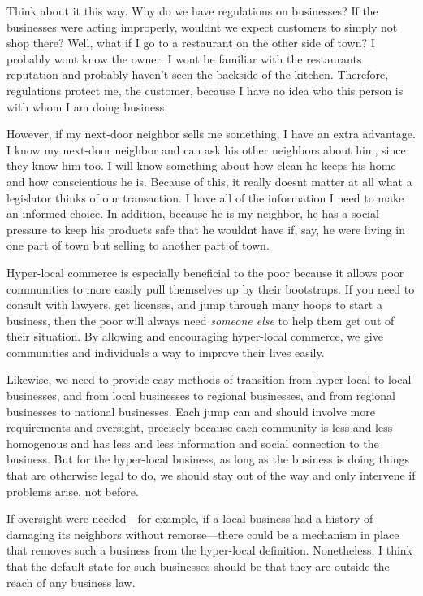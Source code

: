 Think about it this way. Why do we have regulations on businesses?  If
the businesses were acting improperly, wouldn{\textquotesingle}t we
expect customers to simply not shop there?  Well,
what if I go to a
restaurant on the other side of town? I probably won{\textquotesingle}t
know the owner. I won{\textquotesingle}t be familiar with the
restaurant{\textquotesingle}s reputation and probably haven’t seen the
backside of the kitchen. Therefore, regulations protect me, the
customer, because I have no idea who this person is with whom I am
doing business.


However, if my next-door neighbor sells me something, I have an extra
advantage. I know my next-door neighbor and can ask his other neighbors
about him, since they know him too. I will know something about how
clean he keeps his home and how conscientious he is. Because of this,
it really doesn{\textquotesingle}t matter at all what a legislator
thinks of our transaction. I have all of the information I need to make
an informed choice. In addition, because he is my neighbor, he has a
social pressure to keep his products safe that he
wouldn{\textquotesingle}t have if, say, he were living in one part of
town but selling to another part of town.


Hyper-local commerce
is especially beneficial to the poor because it allows poor communities
to more easily pull themselves up by their bootstraps. If you need to
consult with lawyers, get licenses, and jump through many hoops to
start a business, then the poor will always need \textit{someone else}
to help them get out of their situation. By allowing and encouraging
hyper-local commerce, we give communities and individuals a way to
improve their lives easily.


Likewise, we need to provide easy methods of transition from hyper-local
to local businesses, and from local businesses to regional businesses,
and from regional businesses to national businesses. Each jump can and
should involve more requirements and oversight, precisely because each
community is less and less homogenous and has less and less information
and social connection to the business. But for the hyper-local
business, as long as the business is doing things that are otherwise
legal to do, we should stay out of the way and only intervene if
problems arise, not before.


If oversight were
needed—for example, if a local business had a history of damaging its
neighbors without remorse—there could be a mechanism in place that
removes such a business from the hyper-local definition.  Nonetheless,
I think that the default state for such businesses should be that they
are outside the reach of any business law. 


